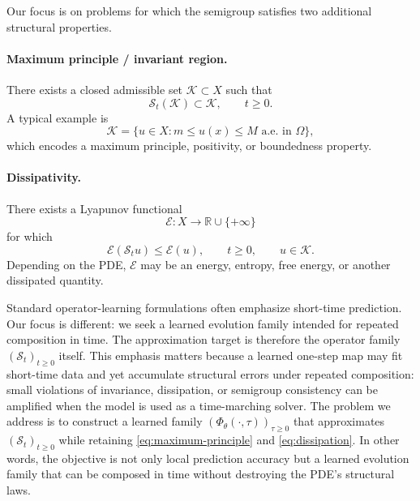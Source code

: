 \documentclass[11pt]{article}
\newcommand{\R}{\mathbb{R}}
\newcommand{\cS}{\mathcal{S}}
\newcommand{\cK}{\mathcal{K}}
\newcommand{\cE}{\mathcal{E}}
\newcommand{\PhiT}{\Phi_{\theta}}
\begin{document}
Our focus is on problems for which the semigroup satisfies two additional structural properties.

\paragraph{Maximum principle / invariant region.}
There exists a closed admissible set \(\cK\subset X\) such that
\begin{equation}\label{eq:maximum-principle}
\cS_t(\cK)\subset \cK, \qquad t\ge 0.
\end{equation}
A typical example is
\begin{equation}\label{eq:box-invariant}
\cK = \{u\in X : m\le u(x)\le M \text{ a.e. in } \Omega\},
\end{equation}
which encodes a maximum principle, positivity, or boundedness property.

\paragraph{Dissipativity.}
There exists a Lyapunov functional
\begin{equation}\label{eq:energy-type}
\cE : X \to \R\cup\{+\infty\}
\end{equation}
for which
\begin{equation}\label{eq:dissipation}
\cE(\cS_tu) \le \cE(u), \qquad t\ge 0, \qquad u\in \cK.
\end{equation}
Depending on the PDE, \(\cE\) may be an energy, entropy, free energy, or another dissipated quantity.

Standard operator-learning formulations often emphasize short-time prediction. Our focus is different: we seek a learned evolution family intended for repeated composition in time. The approximation target is therefore the operator family \((\cS_t)_{t\ge 0}\) itself. This emphasis matters because a learned one-step map may fit short-time data and yet accumulate structural errors under repeated composition: small violations of invariance, dissipation, or semigroup consistency can be amplified when the model is used as a time-marching solver. The problem we address is to construct a learned family \((\PhiT(\cdot,\tau))_{\tau\ge 0}\) that approximates \((\cS_t)_{t\ge 0}\) while retaining \eqref{eq:maximum-principle} and \eqref{eq:dissipation}. In other words, the objective is not only local prediction accuracy but a learned evolution family that can be composed in time without destroying the PDE's structural laws.
\end{document}
